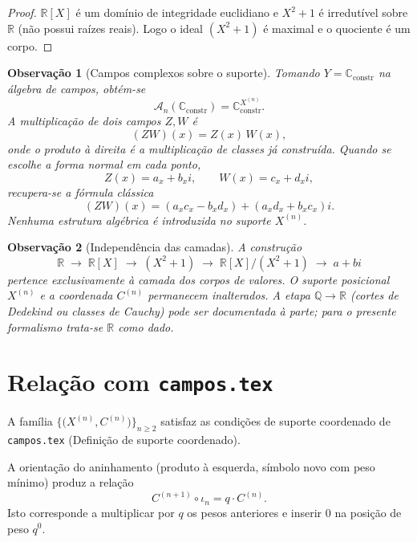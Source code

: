 \documentclass[11pt,a4paper]{article}
\newtheorem{observacao}{Observação}
\begin{document}
\begin{proof}
\(\mathbb R[X]\) é um domínio de integridade euclidiano e \(X^2+1\) é irredutível sobre \(\mathbb R\) (não possui raízes reais). Logo o ideal \((X^2+1)\) é maximal e o quociente é um corpo.
\end{proof}

\begin{observacao}[Campos complexos sobre o suporte]
\label{obs:An-C}
Tomando \(Y=\mathbb C_{\mathrm{constr}}\) na álgebra de campos, obtém-se
\[
\mathcal A_n(\mathbb C_{\mathrm{constr}})
=
\mathbb C_{\mathrm{constr}}^{X^{(n)}}.
\]
A multiplicação de dois campos \(Z,W\) é
\[
(ZW)(x)
=
Z(x)\,W(x),
\]
onde o produto à direita é a multiplicação de classes já construída.
Quando se escolhe a forma normal em cada ponto,
\[
Z(x)=a_x+b_x i,
\qquad
W(x)=c_x+d_x i,
\]
recupera-se a fórmula clássica
\[
(ZW)(x)
=
(a_xc_x-b_xd_x)
+
(a_xd_x+b_xc_x)i.
\]
Nenhuma estrutura algébrica é introduzida no suporte \(X^{(n)}\).
\end{observacao}

\begin{observacao}[Independência das camadas]
\label{obs:independencia-C}
A construção
\[
\mathbb R
\;\longrightarrow\;
\mathbb R[X]
\;\longrightarrow\;
(X^2+1)
\;\longrightarrow\;
\mathbb R[X]/(X^2+1)
\;\longrightarrow\;
a+bi
\]
pertence exclusivamente à camada dos corpos de valores.
O suporte posicional \(X^{(n)}\) e a coordenada \(C^{(n)}\) permanecem inalterados.
A etapa \(\mathbb Q\to\mathbb R\) (cortes de Dedekind ou classes de Cauchy) pode ser documentada à parte; para o presente formalismo trata-se \(\mathbb R\) como dado.
\end{observacao}

\section{Relação com \texttt{campos.tex}}

A família \(\bigl\{\bigl(X^{(n)},C^{(n)}\bigr)\bigr\}_{n\ge 2}\) satisfaz as condições de suporte coordenado de \texttt{campos.tex} (Definição de suporte coordenado).

A orientação do aninhamento (produto à esquerda, símbolo novo com peso mínimo) produz a relação
\[
C^{(n+1)}\circ\iota_n
=
q\cdot C^{(n)}.
\]
Isto corresponde a multiplicar por \(q\) os pesos anteriores e inserir \(0\) na posição de peso \(q^0\).
\end{document}
